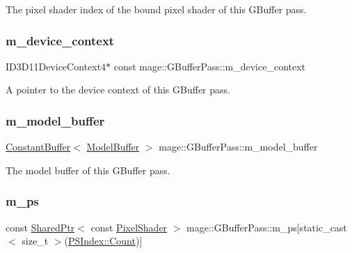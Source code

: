 The pixel shader index of the bound pixel shader of this G\+Buffer pass. \hypertarget{classmage_1_1_g_buffer_pass_a56bcb08adf8a9b04a15efe24ef703c32}{}\label{classmage_1_1_g_buffer_pass_a56bcb08adf8a9b04a15efe24ef703c32} 
\subsubsection{\texorpdfstring{m\+\_\+device\+\_\+context}{m\_device\_context}}
{\footnotesize\ttfamily I\+D3\+D11\+Device\+Context4$\ast$ const mage\+::\+G\+Buffer\+Pass\+::m\+\_\+device\+\_\+context\hspace{0.3cm}{\ttfamily [private]}}

A pointer to the device context of this G\+Buffer pass. \hypertarget{classmage_1_1_g_buffer_pass_a0538769957df6740993dbb479b7e05a2}{}\label{classmage_1_1_g_buffer_pass_a0538769957df6740993dbb479b7e05a2} 
\subsubsection{\texorpdfstring{m\+\_\+model\+\_\+buffer}{m\_model\_buffer}}
{\footnotesize\ttfamily \hyperlink{classmage_1_1_constant_buffer}{Constant\+Buffer}$<$ \hyperlink{structmage_1_1_model_buffer}{Model\+Buffer} $>$ mage\+::\+G\+Buffer\+Pass\+::m\+\_\+model\+\_\+buffer\hspace{0.3cm}{\ttfamily [private]}}

The model buffer of this G\+Buffer pass. \hypertarget{classmage_1_1_g_buffer_pass_ae607b9a6dab89d45865dc0ede3212fcd}{}\label{classmage_1_1_g_buffer_pass_ae607b9a6dab89d45865dc0ede3212fcd} 
\subsubsection{\texorpdfstring{m\+\_\+ps}{m\_ps}}
{\footnotesize\ttfamily const \hyperlink{namespacemage_a1e01ae66713838a7a67d30e44c67703e}{Shared\+Ptr}$<$ const \hyperlink{namespacemage_a27ecaf266420ee7a494d64edc0757129}{Pixel\+Shader} $>$ mage\+::\+G\+Buffer\+Pass\+::m\+\_\+ps\mbox{[}static\+\_\+cast$<$ size\+\_\+t $>$(\hyperlink{classmage_1_1_g_buffer_pass_a23039b6695c10c88676c38fe63123571ae93f994f01c537c4e2f7d8528c3eb5e9}{P\+S\+Index\+::\+Count})\mbox{]}\hspace{0.3cm}{\ttfamily [private]}}

